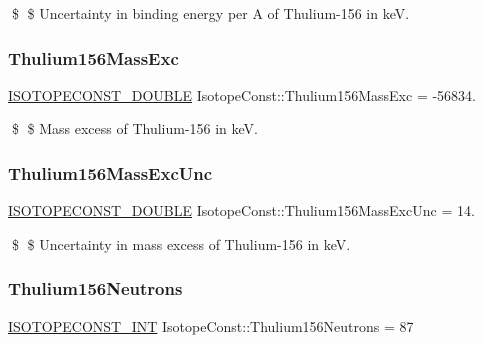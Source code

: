 \$ \$ Uncertainty in binding energy per A of Thulium-\/156 in keV. \mbox{\label{group___isotope_const-_thulium-_tm156_ga3874f194a4bbcf9448195773d908b13e}} 
\subsubsection{\texorpdfstring{Thulium156\+Mass\+Exc}{Thulium156MassExc}}
{\footnotesize\ttfamily \mbox{\hyperlink{group___isotope_const-_macros_ga8f45a7272ce02c0b4c65c44636ed719a}{I\+S\+O\+T\+O\+P\+E\+C\+O\+N\+S\+T\+\_\+\+D\+O\+U\+B\+LE}} Isotope\+Const\+::\+Thulium156\+Mass\+Exc = -\/56834.}

\$ \$ Mass excess of Thulium-\/156 in keV. \mbox{\label{group___isotope_const-_thulium-_tm156_ga80f8d6c32f98bf14480faea158cc4418}} 
\subsubsection{\texorpdfstring{Thulium156\+Mass\+Exc\+Unc}{Thulium156MassExcUnc}}
{\footnotesize\ttfamily \mbox{\hyperlink{group___isotope_const-_macros_ga8f45a7272ce02c0b4c65c44636ed719a}{I\+S\+O\+T\+O\+P\+E\+C\+O\+N\+S\+T\+\_\+\+D\+O\+U\+B\+LE}} Isotope\+Const\+::\+Thulium156\+Mass\+Exc\+Unc = 14.}

\$ \$ Uncertainty in mass excess of Thulium-\/156 in keV. \mbox{\label{group___isotope_const-_thulium-_tm156_ga9498ea093ab7a2b3ed256755a97f2627}} 
\subsubsection{\texorpdfstring{Thulium156\+Neutrons}{Thulium156Neutrons}}
{\footnotesize\ttfamily \mbox{\hyperlink{group___isotope_const-_macros_ga5f18360b3e99483a35c32d789e62621c}{I\+S\+O\+T\+O\+P\+E\+C\+O\+N\+S\+T\+\_\+\+I\+NT}} Isotope\+Const\+::\+Thulium156\+Neutrons = 87}

